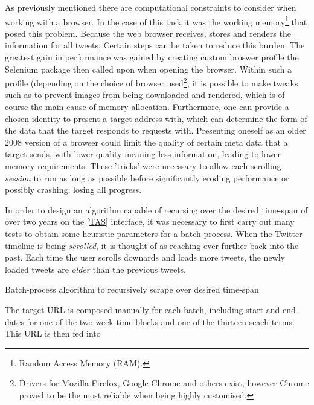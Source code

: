 \documentclass{article}
\begin{document}
As previously mentioned there are computational constraints to consider when working with a browser. In the case of this task it was the working memory\footnote{Random Access Memory (RAM).} that posed this problem. Because the web browser receives, stores and renders the information for all tweets, 
Certain steps can be taken to reduce this burden. The greatest gain in performance was gained by creating custom broswer profile the Selenium package then called upon when opening the browser. Within such a profile (depending on the choice of browser used\footnote{Drivers for Mozilla Firefox, Google Chrome and others exist, however Chrome proved to be the most reliable when being highly customised.}, it is possible to make tweaks such as to prevent images from being downloaded and rendered, which is of course the main cause of memory allocation. Furthermore, one can provide a chosen identity to present a target address with, which can determine the form of the data that the target responds to requests with. Presenting oneself as an older 2008 version of a browser could limit the quality of certain meta data that a target sends, with lower quality meaning less information, leading to lower memory requirements.
These 'tricks' were necessary to allow each scrolling \emph{session} to run as long as possible before significantly eroding performance or possibly crashing, losing all progress.

In order to design an algorithm capable of recursing over the desired time-span of over two years on the \ref{TAS} interface, it was necessary to first carry out many tests to obtain some heuristic parameters for a batch-process.
When the Twitter timeline is being \emph{scrolled}, it is thought of as reaching ever further back into the past. Each time the user scrolls downards and loads more tweets, the newly loaded tweets are \emph{older} than the previous tweets.

\begin{algorithm}[H]
 \caption{Batch-process algorithm to recursively scrape over desired time-span}
\end{algorithm}

The target URL is composed manually for each batch, including start and end dates for one of the two week time blocks and one of the thirteen seach terms. This URL is then fed into 
\end{document}
